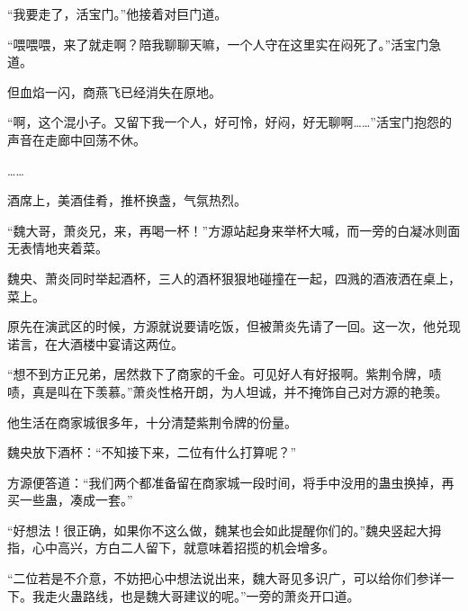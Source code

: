 \begin{this_body}
“我要走了，活宝门。”他接着对巨门道。

“喂喂喂，来了就走啊？陪我聊聊天嘛，一个人守在这里实在闷死了。”活宝门急道。

但血焰一闪，商燕飞已经消失在原地。

“啊，这个混小子。又留下我一个人，好可怜，好闷，好无聊啊……”活宝门抱怨的声音在走廊中回荡不休。

……

酒席上，美酒佳肴，推杯换盏，气氛热烈。

“魏大哥，萧炎兄，来，再喝一杯！”方源站起身来举杯大喊，而一旁的白凝冰则面无表情地夹着菜。

魏央、萧炎同时举起酒杯，三人的酒杯狠狠地碰撞在一起，四溅的酒液洒在桌上，菜上。

原先在演武区的时候，方源就说要请吃饭，但被萧炎先请了一回。这一次，他兑现诺言，在大酒楼中宴请这两位。

“想不到方正兄弟，居然救下了商家的千金。可见好人有好报啊。紫荆令牌，啧啧，真是叫在下羡慕。”萧炎性格开朗，为人坦诚，并不掩饰自己对方源的艳羡。

他生活在商家城很多年，十分清楚紫荆令牌的份量。

魏央放下酒杯：“不知接下来，二位有什么打算呢？”

方源便答道：“我们两个都准备留在商家城一段时间，将手中没用的蛊虫换掉，再买一些蛊，凑成一套。”

“好想法！很正确，如果你不这么做，魏某也会如此提醒你们的。”魏央竖起大拇指，心中高兴，方白二人留下，就意味着招揽的机会增多。

“二位若是不介意，不妨把心中想法说出来，魏大哥见多识广，可以给你们参详一下。我走火蛊路线，也是魏大哥建议的呢。”一旁的萧炎开口道。

\end{this_body}

